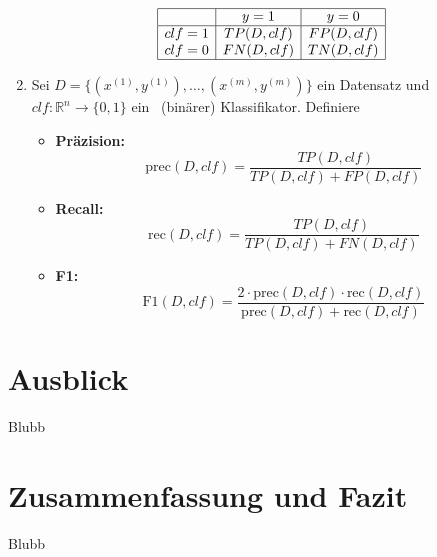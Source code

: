 \documentclass[researchlab,palatino]{AIGpaper}
\begin{document}
\begin{enumerate}
\[
\begin{array}{|c|c|c|}
\hline
 & y = 1 & y = 0 \\
\hline
clf = 1 & TP(D, clf) & FP(D, clf) \\
clf = 0 & FN(D, clf) & TN(D, clf) \\
\hline
\end{array}
\]
\item
Sei $D = \{(x^{(1)}, y^{(1)}), \dots, (x^{(m)}, y^{(m)})\}$ ein Datensatz und $clf: \mathbb{R}^n \to \{0, 1\}$ ein ~(binärer) Klassifikator. Definiere
\begin{itemize}
    \item \textbf{Präzision:}
    \begin{equation}
    \text{prec}(D, clf) = \frac{TP(D, clf)}{TP(D, clf) + FP(D, clf)}
     \end{equation}
    \item \textbf{Recall:}
 \begin{equation}
    \text{rec}(D, clf) = \frac{TP(D, clf)}{TP(D, clf) + FN(D, clf)}
    \end{equation}
    \item \textbf{F1:}
    \begin{equation}
    \text{F1}(D, clf) = \frac{2 \cdot \text{prec}(D, clf) \cdot \text{rec}(D, clf)}{\text{prec}(D, clf) + \text{rec}(D, clf)}
    \end{equation}
\end{itemize}
\end{enumerate}

\section{Ausblick}
Blubb

\section{Zusammenfassung und Fazit}
Blubb
\addreferences

\end{document}
